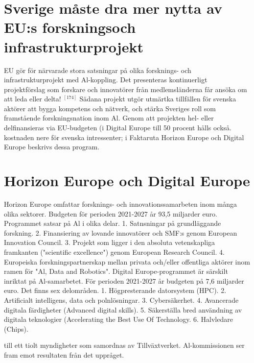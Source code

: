 {{{{{{{{{{{{{{\section*{Sverige måste dra mer nytta av EU:s forskningsoch infrastrukturprojekt}
EU gör för närvarade stora satsningar på olika forsknings- och infrastrukturprojekt med Al-koppling. Det presenteras kontinuerligt projektförslag som forskare och innovatörer från medlemsländerna får ansöka om att leda eller delta! \({ }^{[174]}\) Sädana projekt utgör utmärtka tillfällen för svenska aktörer att bygga kompetens och nätverk, och stärka Sveriges roll som framstående forskningsnation inom Al. Genom att projekten hel- eller delfinansieras via EU-budgeten (i Digital Europe till 50 procent hålls också. kostnaden nere för svenska intressenter; i Faktaruta Horizon Europe och Digital Europe beskrivs dessa program.
\section*{Horizon Europe och Digital Europe}
Horizon Europe omfattar forsknings- och innovationssamarbeten inom många olika sektorer. Budgeten för perioden 2021-2027 år 93,5 miljarder euro. Programmet satsar på Al i olika delar.
1. Satnsningar på grundläggande forskning.
2. Finansiering av lovande innovatörer och SMF:s genom European Innovation Council.
3. Projekt som ligger i den absoluta vetenskapliga framkanten ("scientific excellence") genom European Research Council.
4. Europeiska forskningspartnerskap mellan privata och/eller offentliga aktörer inom ramen för "Al, Data and Robotics".
Digital Europe-programmet är särskilt inriktat på Al-samarbetet. För perioden 2021-2027 år budgeten på 7,6 miljarder euro. Det finns sex delområden.
1. Högpresterande datorsystem (HPC).
2. Artificialt intelligens, data och polnlösningar.
3. Cybersäkerhet.
4. Avancerade digitala färdigheter (Advanced digital skills).
5. Säkerställa bred användning av digitala teknologier (Accelerating the Best Use Of Technology.
6. Halvledare (Chips).

till ett tiolt myndigheter som samordnas av Tillväxtverket. Al-kommissionen ser fram emot resultaten från det uppråget. \({ }^{}\)
}}}}}}}}}}}}}}
